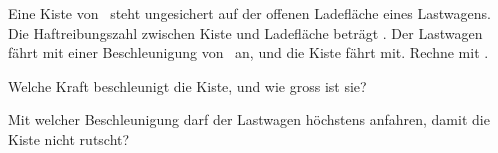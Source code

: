 Eine Kiste von \mO\ steht ungesichert auf der offenen Ladefläche eines Lastwagens. Die Haftreibungszahl zwischen Kiste und Ladefläche beträgt \muHO. Der Lastwagen fährt mit einer Beschleunigung von \aO\ an, und die Kiste fährt mit. Rechne mit \gO.

\begin{abcliste}
\abc
Welche Kraft beschleunigt die Kiste, und wie gross ist sie?

\abc
Mit welcher Beschleunigung darf der Lastwagen höchstens anfahren, damit die Kiste nicht rutscht?
\end{abcliste}
